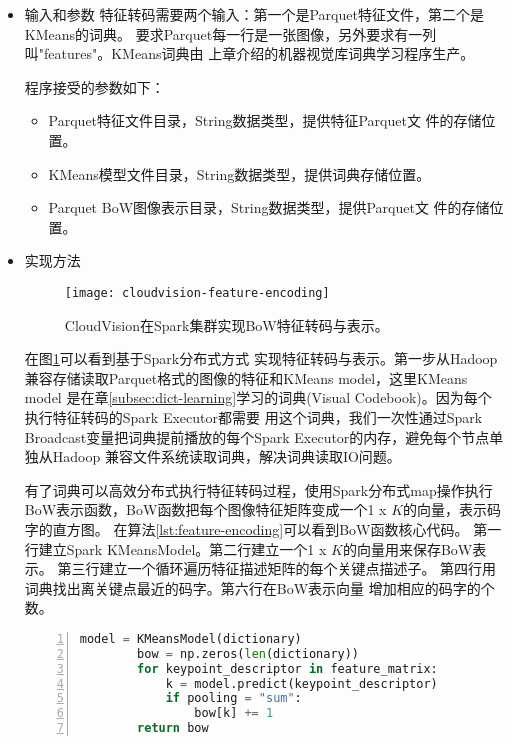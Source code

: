\begin{itemize}
  \item 输入和参数 
        特征转码需要两个输入：第一个是Parquet特征文件，第二个是KMeans的词典。
        要求Parquet每一行是一张图像，另外要求有一列叫"features"。KMeans词典由
        上章介绍的机器视觉库词典学习程序生产。

        程序接受的参数如下：
        \begin{itemize}
          \item Parquet特征文件目录，String数据类型，提供特征Parquet文
                件的存储位置。
          \item KMeans模型文件目录，String数据类型，提供词典存储位置。
          \item Parquet BoW图像表示目录，String数据类型，提供Parquet文
                件的存储位置。
        \end{itemize}
  \item 实现方法

       \begin{figure}[h]
          \centering
            \texttt{[image: cloudvision-feature-encoding]}
          \caption{CloudVision在Spark集群实现BoW特征转码与表示。}
          \label{fig:cloudvision-feature-encoding}
        \end{figure}
        在图\ref{fig:cloudvision-feature-encoding}可以看到基于Spark分布式方式
        实现特征转码与表示。第一步从Hadoop兼容存储读取Parquet格式的图像的特征和KMeans model，这里KMeans model
        是在章\ref{subsec:dict-learning}学习的词典(Visual Codebook)。因为每个执行特征转码的Spark Executor都需要
        用这个词典，我们一次性通过Spark Broadcast变量把词典提前播放的每个Spark Executor的内存，避免每个节点单独从Hadoop
        兼容文件系统读取词典，解决词典读取IO问题。\cite{spark-programming-guide}

        有了词典可以高效分布式执行特征转码过程，使用Spark分布式map操作执行
        BoW表示函数，BoW函数把每个图像特征矩阵变成一个1 x $K$的向量，表示码字的直方图。
        在算法\ref{lst:feature-encoding}可以看到BoW函数核心代码。
        第一行建立Spark KMeansModel。第二行建立一个1 x $K$的向量用来保存BoW表示。
        第三行建立一个循环遍历特征描述矩阵的每个关键点描述子。
        第四行用词典找出离关键点最近的码字。第六行在BoW表示向量
        增加相应的码字的个数。
        \begin{minipage}{\textwidth}
        \begin{lstlisting}[language=Python,
                           basicstyle=\small,
                           numbers=left,
                           showstringspaces=false,
                           caption={BoW特征转码核心代码},
                           label={lst:feature-encoding}]
        model = KMeansModel(dictionary)
        bow = np.zeros(len(dictionary))
        for keypoint_descriptor in feature_matrix:
            k = model.predict(keypoint_descriptor)
            if pooling = "sum":
                bow[k] += 1
        return bow
        \end{lstlisting}
        \end{minipage}


\end{itemize}
